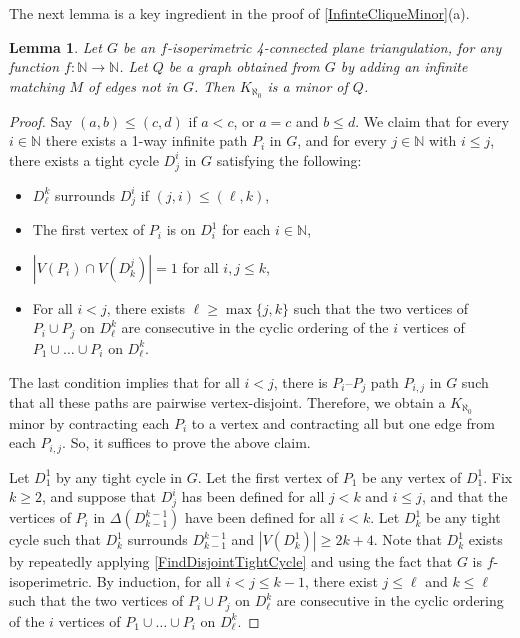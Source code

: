 \documentclass[a4paper,11pt]{article}
\theoremstyle{plain}
\newtheorem{lem}[thm]{Lemma}
\theoremstyle{definition}
\renewcommand{\geq}{\geqslant}
\renewcommand{\leq}{\leqslant}
\newcommand{\NN}{\mathbb{N}}
\begin{document}
The next lemma is a key ingredient in the proof of \cref{InfinteCliqueMinor}(a).

\begin{lem}
\label{StrongerConstructMinor}
Let $G$ be an $f$-isoperimetric 4-connected plane triangulation, for any function $f: \NN \to \NN$. Let $Q$ be a graph obtained from $G$ by adding an infinite matching $M$ of edges not in $G$. Then $K_{\aleph_0}$ is a minor of $Q$. 
\end{lem}

\begin{proof}
Say $(a,b)\leq (c,d)$ if $a<c$, or $a=c$ and $b\leq d$. We claim that for every $i\in\NN$ there exists a 1-way infinite path $P_i$ in $G$, and for every $j\in\NN$ with $i \leq j$, there exists a tight cycle $D_j^i$ in $G$ satisfying the following:
\begin{itemize}
    \item $D_\ell^k$ surrounds $D_j^i$ if $(j,i) \leq (\ell,k)$,
    \item The first vertex of $P_i$ is on $D_i^1$ for each $i\in\NN$,
    \item $|V(P_i) \cap V(D_k^j)|=1$ for all $i,j \leq k$,
    \item For all $i < j$, there exists $\ell\geq\max\{j,k\}$ such that the two vertices of $P_i \cup P_j$ on $D_\ell^k$ are consecutive in the cyclic ordering of the $i$ vertices of $P_1 \cup \dots \cup P_i$ on $D_\ell^k$.
\end{itemize}
The last condition implies that for all $i<j$, there is $P_i$--$P_j$ path $P_{i,j}$ in $G$ such that all these paths are pairwise vertex-disjoint.  Therefore, we obtain a $K_{\aleph_0}$ minor by contracting each $P_i$ to a vertex and contracting all but one edge from each $P_{i,j}$.  So, it suffices to prove the above claim.

Let $D_1^1$ by any tight cycle in $G$. Let the first vertex of $P_1$ be any vertex of $D_1^1$.  Fix $k \geq 2$, and suppose that $D_j^i$ has been defined for all $j < k$ and $i \leq j$, and that the vertices of $P_i$ in $\Delta(D_{k-1}^{k-1})$ have been defined for all $i < k$.  Let $D_k^1$ be any tight cycle such that $D_k^1$ surrounds $D_{k-1}^{k-1}$ and $|V(D_k^1)| \geq 2k+4$.  Note that $D_k^1$ exists by repeatedly applying \cref{FindDisjointTightCycle} and using the fact that $G$ is $f$-isoperimetric. By induction, for all $i<j \leq k-1$, there exist $j \leq \ell$ and $k \leq \ell$ such that the two vertices of $P_i \cup P_j$ on $D_\ell^k$ are consecutive in the cyclic ordering of the $i$ vertices of $P_1 \cup \dots \cup P_i$ on $D_\ell^k$.


\end{proof}
\end{document}
